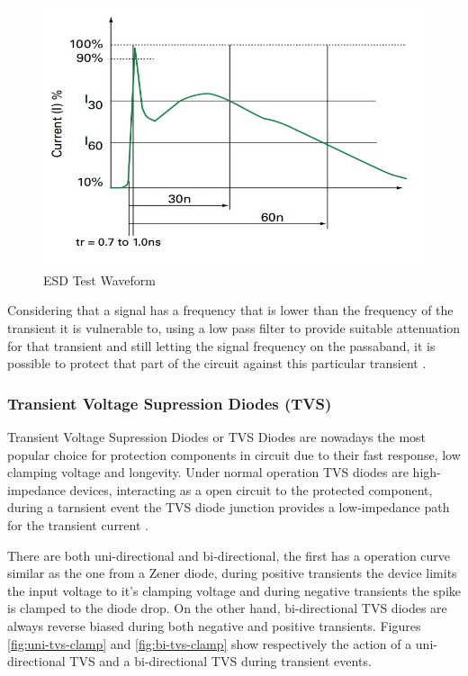 		\begin{figure}[htbp]
			\centering
				\includegraphics[scale=0.6]{figuras/fig-esd-test-waveform}
			\caption{ESD Test Waveform \cite{esd-test-waveform}}
			\label{fig:esd-test-waveform}
		\end{figure}

		Considering that a signal has a frequency that is lower than the frequency of the transient it is vulnerable to, using a low pass filter to provide suitable attenuation for that transient and still letting the signal frequency on the passaband, it is possible to protect that part of the circuit against this particular transient \cite{standler1988use}. 


	\subsubsection{Transient Voltage Supression Diodes (TVS)}\label{sssec:tvsTransientProtection}

		\label{ssssec:tvsOperation}
			Transient Voltage Supression Diodes or TVS Diodes are nowadays the most popular choice for protection components in circuit due to their fast response, low clamping voltage and longevity. Under normal operation TVS diodes are high-impedance devices, interacting as a open circuit to the protected component, during a tarnsient event the TVS diode junction provides a low-impedance path for the transient current \cite{renesasTVS}.
			\par
			There are both uni-directional and bi-directional, the first has a operation curve similar as the one from a Zener diode, during positive transients the device limits the input voltage to it's clamping voltage and during negative transients the spike is clamped to the diode drop. On the other hand, bi-directional TVS diodes are always reverse biased during both negative and positive transients. Figures \ref{fig:uni-tvs-clamp} and \ref{fig:bi-tvs-clamp} show respectively the action of a uni-directional TVS and a bi-directional TVS during transient events.

